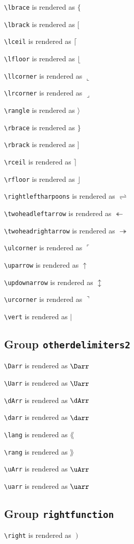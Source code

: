 \texttt{\textbackslash lbrace} is rendered as $\lbrace$

\texttt{\textbackslash lbrack} is rendered as $\lbrack$

\texttt{\textbackslash lceil} is rendered as $\lceil$

\texttt{\textbackslash lfloor} is rendered as $\lfloor$

\texttt{\textbackslash llcorner} is rendered as $\llcorner$

\texttt{\textbackslash lrcorner} is rendered as $\lrcorner$

\texttt{\textbackslash rangle} is rendered as $\rangle$

\texttt{\textbackslash rbrace} is rendered as $\rbrace$

\texttt{\textbackslash rbrack} is rendered as $\rbrack$

\texttt{\textbackslash rceil} is rendered as $\rceil$

\texttt{\textbackslash rfloor} is rendered as $\rfloor$

\texttt{\textbackslash rightleftharpoons} is rendered as $\rightleftharpoons$

\texttt{\textbackslash twoheadleftarrow} is rendered as $\twoheadleftarrow$

\texttt{\textbackslash twoheadrightarrow} is rendered as $\twoheadrightarrow$

\texttt{\textbackslash ulcorner} is rendered as $\ulcorner$

\texttt{\textbackslash uparrow} is rendered as $\uparrow$

\texttt{\textbackslash updownarrow} is rendered as $\updownarrow$

\texttt{\textbackslash urcorner} is rendered as $\urcorner$

\texttt{\textbackslash vert} is rendered as $\vert$

\subsection{ Group \texttt{other\textunderscore delimiters2}}

\texttt{\textbackslash Darr} is rendered as $\Darr$

\texttt{\textbackslash Uarr} is rendered as $\Uarr$

\texttt{\textbackslash dArr} is rendered as $\dArr$

\texttt{\textbackslash darr} is rendered as $\darr$

\texttt{\textbackslash lang} is rendered as $\lang$

\texttt{\textbackslash rang} is rendered as $\rang$

\texttt{\textbackslash uArr} is rendered as $\uArr$

\texttt{\textbackslash uarr} is rendered as $\uarr$

\subsection{ Group \texttt{right\textunderscore function}}

\texttt{\textbackslash right} is rendered as $\left. \right)$